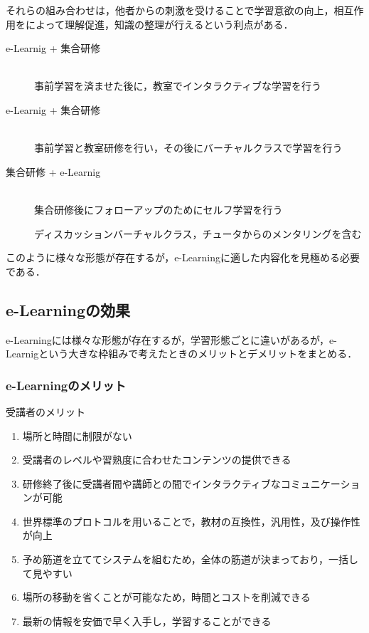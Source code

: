 \documentclass[a4j,12pt]{jsarticle}
\begin{document}
それらの組み合わせは，他者からの刺激を受けることで学習意欲の向上，相互作用をによって理解促進，知識の整理が行えるという利点がある．
\begin{description} 

\item[e-Learnig + 集合研修]\mbox{}\\ 
事前学習を済ませた後に，教室でインタラクティブな学習を行う

\item[e-Learnig + 集合研修]\mbox{}\\ 
事前学習と教室研修を行い，その後にバーチャルクラスで学習を行う

\item[集合研修 + e-Learnig]\mbox{}\\ 
集合研修後にフォローアップのためにセルフ学習を行う

ディスカッションバーチャルクラス，チュータからのメンタリングを含む
\end{description}
このように様々な形態が存在するが，e-Learningに適した内容化を見極める必要である．
\newpage

\subsection{e-Learningの効果}
e-Learningには様々な形態が存在するが，学習形態ごとに違いがあるが，e-Learnigという大きな枠組みで考えたときのメリットとデメリットをまとめる．
\subsubsection{e-Learningのメリット}
\begin{large}受講者のメリット\end{large}
\begin{enumerate}
\item 場所と時間に制限がない
\item 受講者のレベルや習熟度に合わせたコンテンツの提供できる
\item 研修終了後に受講者間や講師との間でインタラクティブなコミュニケーションが可能
\item 世界標準のプロトコルを用いることで，教材の互換性，汎用性，及び操作性が向上
\item 予め筋道を立ててシステムを組むため，全体の筋道が決まっており，一括して見やすい
\item 場所の移動を省くことが可能なため，時間とコストを削減できる
\item 最新の情報を安価で早く入手し，学習することができる
\end{enumerate}
\end{document}
